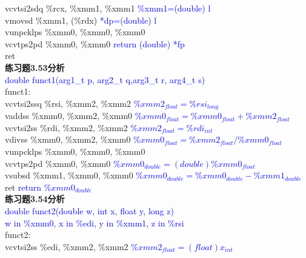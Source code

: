 \documentclass{article}
\newcommand{\blue}[1]{\textcolor{blue}{#1}}
\begin{document}
\begin{CJK}{UTF8}{gbsn}
	\hspace*{1em}vcvtsi2sdq \%rcx, \%xmm1, \%xmm1 \blue{\%xmm1=(double) l}	\\
	\hspace*{1em}vmovsd \%xmm1, (\%rdx) \blue{*dp=(double) l}	\\
	\hspace*{1em}vunpcklps \%xmm0, \%xmm0, \%xmm0 \blue{}	\\
	\hspace*{1em}vcvtps2pd \%xmm0, \%xmm0 \blue{return (double) *fp}	\\
	\hspace*{1em}ret	\\[3ex]
\textbf{练习题3.53分析}	\\
\blue{double funct1(arg1\_t p, arg2\_t q,arg3\_t r, arg4\_t s)}	\\
funct1:	\\
\hspace*{1em}vcvtsi2ssq	\%rsi, \%xmm2, \%xmm2 \blue{$\%xmm2_{float}=\%rsi_{long}$}	\\
\hspace*{1em}vaddss	\%xmm0, \%xmm2, \%xmm0 \blue{$\%xmm0_{float}=\%xmm0_{float}+\%xmm2_{float}$}	\\
\hspace*{1em}vcvtsi2ss	\%rdi, \%xmm2, \%xmm2 \blue{$\%xmm2_{float}=\%rdi_{int}$}	\\
\hspace*{1em}vdivss	\%xmm0, \%xmm2, \%xmm0 \blue{$\%xmm0_{float}=\%xmm2_{float}/\%xmm0_{float}$}	\\
\hspace*{1em}vunpcklps	\%xmm0, \%xmm0, \%xmm0 \blue{}	\\
\hspace*{1em}vcvtps2pd	\%xmm0, \%xmm0 \blue{$\%xmm0_{double}=(double)\%xmm0_{float}$}	\\
\hspace*{1em}vsubsd	\%xmm1, \%xmm0, \%xmm0 \blue{$\%xmm0_{double}=\%xmm0_{double}-\%xmm1_{double}$}	\\
\hspace*{1em}ret \blue{return $\%xmm0_{double}$}	\\[3ex]
\newpage
\noindent\textbf{练习题3.54分析}	\\
\blue{double funct2(double w, int x, float y, long z)}	\\
\blue{w in \%xmm0, x in \%edi, y in \%xmm1, z in \%rsi}	\\
funct2:	\\
\hspace*{1em}vcvtsi2ss	\%edi, \%xmm2, \%xmm2 \blue{$\%xmm2_{float}=(float)x_{int}$}	\\

\end{CJK}
\end{document}
